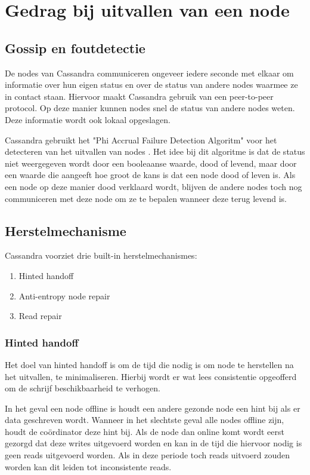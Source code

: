 \chapter{Gedrag bij uitvallen van een node}
\label{ch:cassandra_uitval}

\section{Gossip en foutdetectie}
De nodes van Cassandra communiceren ongeveer iedere seconde met elkaar om informatie over hun eigen status en over de status van andere nodes waarmee ze in contact staan.
Hiervoor maakt Cassandra gebruik van een peer-to-peer protocol.
Op deze manier kunnen nodes snel de status van andere nodes weten.
Deze informatie wordt ook lokaal opgeslagen.

Cassandra gebruikt het "Phi Accrual Failure Detection Algoritm" voor het detecteren van het uitvallen van nodes \citep{kan2014cassandra}.
Het idee bij dit algoritme is dat de status niet weergegeven wordt door een booleaanse waarde, dood of levend, maar door een waarde die aangeeft hoe groot de kans is dat een node dood of leven is.
Als een node op deze manier dood verklaard wordt, blijven de andere nodes toch nog communiceren met deze node om ze te bepalen wanneer deze terug levend is.

\section{Herstelmechanisme}
Cassandra voorziet drie built-in herstelmechanismes:

\begin{enumerate}
	\item Hinted handoff
	\item Anti-entropy node repair
	\item Read repair
\end{enumerate}

\subsection{Hinted handoff}
Het doel van hinted handoff is om de tijd die nodig is om node te herstellen na het uitvallen, te minimaliseren.
Hierbij wordt er wat lees consistentie opgeofferd om de schrijf beschikbaarheid te verhogen.

In het geval een node offline is houdt een andere gezonde node een hint bij als er data geschreven wordt.
Wanneer in het slechtste geval alle nodes offline zijn, houdt de coördinator deze hint bij.
Als de node dan online komt wordt eerst gezorgd dat deze writes uitgevoerd worden en kan in de tijd die hiervoor nodig is geen reads uitgevoerd worden.
Als in deze periode toch reads uitvoerd zouden worden kan dit leiden tot inconsistente reads.

